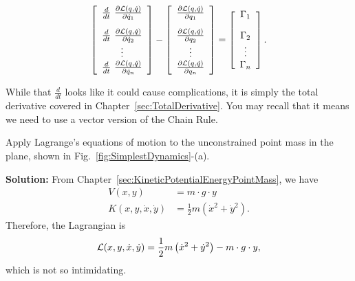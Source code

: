\begin{tcolorbox}[colback=mylightblue, title = {\bf Lagrange's Equations of Motion}, breakable]
\begin{equation}
    \label{eq:LagrangeEoMUmpacked}
\left[ \begin{array}{c}\frac{d}{dt} ~ \frac{ \partial {\cal L}(q, \dot{q})}{\partial \dot{q}_1} 
\\[1em] \frac{d}{dt} ~ \frac{ \partial {\cal L}(q, \dot{q})}{\partial\dot{q}_2} \\ \vdots \\ \frac{d}{dt} ~\frac{ \partial {\cal L}(q, \dot{q})}{\partial\dot{q}_n} 
\end{array} \right] - \left[ \begin{array}{c} \frac{ \partial {\cal L}(q, \dot{q})}{\partial {q}_1} 
\\[1em]  \frac{ \partial {\cal L}(q, \dot{q})}{\partial{q}_2} \\ \vdots \\ \frac{ \partial {\cal L}(q, \dot{q})}{\partial {q}_n} 
\end{array} \right] = \left[ \begin{array}{c} \Gamma_1
\\[1em]  \Gamma_2 \\ \vdots \\ \Gamma_n
\end{array} \right].
\end{equation}


While that $\frac{d}{dt}$ looks like it could cause complications, it is simply the total derivative covered in Chapter~\ref{sec:TotalDerivative}. You may recall that it means we need to use a vector version of the Chain Rule. 
\end{tcolorbox}


\bigskip


\begin{exercise}
    Apply Lagrange's equations of motion to the unconstrained point mass in the plane, shown in Fig.~\ref{fig:SimplestDynamics}-(a).
\end{exercise}

\textbf{Solution:} From Chapter~\ref{sec:KineticPotentialEnergyPointMass}, we have
\begin{align*}
    V(x,y)&= m \cdot g \cdot y \\
    K(x, y, \dot{x}, \dot{y})&= \frac{1}{2} m \left(\dot{x}^2 + \dot{y}^2 \right).
\end{align*}
Therefore, the Lagrangian is 
$$ {\cal L}(x, y, \dot{x}, \dot{y}) = \frac{1}{2} m \left(\dot{x}^2 + \dot{y}^2 \right) -  m \cdot g \cdot y,$$
which is not so intimidating. 

